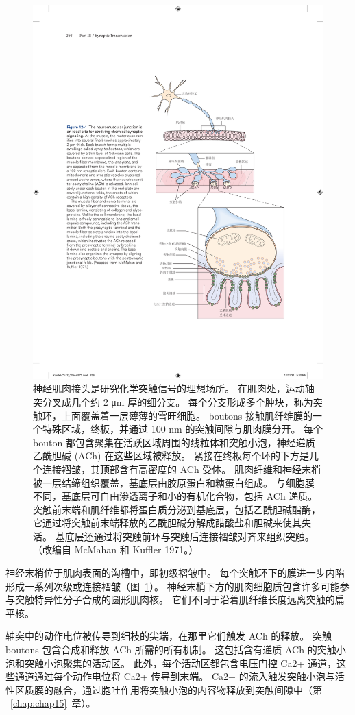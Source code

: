 \begin{figure}[htbp]
	\centering
	\includegraphics[width=0.6\linewidth]{chap12/fig_12_1}
	\caption{神经肌肉接头是研究化学突触信号的理想场所。 在肌肉处，运动轴突分叉成几个约 2 μm 厚的细分支。 每个分支形成多个肿块，称为突触环，上面覆盖着一层薄薄的雪旺细胞。 boutons 接触肌纤维膜的一个特殊区域，终板，并通过 100 nm 的突触间隙与肌肉膜分开。 每个 bouton 都包含聚集在活跃区域周围的线粒体和突触小泡，神经递质乙酰胆碱 (ACh) 在这些区域被释放。 紧接在终板每个环的下方是几个连接褶皱，其顶部含有高密度的 ACh 受体。 肌肉纤维和神经末梢被一层结缔组织覆盖，基底层由胶原蛋白和糖蛋白组成。 与细胞膜不同，基底层可自由渗透离子和小的有机化合物，包括 ACh 递质。 突触前末端和肌纤维都将蛋白质分泌到基底层，包括乙酰胆碱酯酶，它通过将突触前末端释放的乙酰胆碱分解成醋酸盐和胆碱来使其失活。 基底层还通过将突触前环与突触后连接褶皱对齐来组织突触。 （改编自 McMahan 和 Kuffler 1971。）}
	\label{fig:12_1}
\end{figure}


神经末梢位于肌肉表面的沟槽中，即初级褶皱中。
每个突触环下的膜进一步内陷形成一系列次级或连接褶皱（图~\ref{fig:12_1}）。
神经末梢下方的肌肉细胞质包含许多可能参与突触特异性分子合成的圆形肌肉核。
它们不同于沿着肌纤维长度远离突触的扁平核。


轴突中的动作电位被传导到细枝的尖端，在那里它们触发 ACh 的释放。
突触 boutons 包含合成和释放 ACh 所需的所有机制。
这包括含有递质 ACh 的突触小泡和突触小泡聚集的活动区。
此外，每个活动区都包含电压门控 Ca2+ 通道，这些通道通过每个动作电位将 Ca2+ 传导到末端。
Ca2+ 的流入触发突触小泡与活性区质膜的融合，通过胞吐作用将突触小泡的内容物释放到突触间隙中（第 ~\ref{chap:chap15}~章）。


